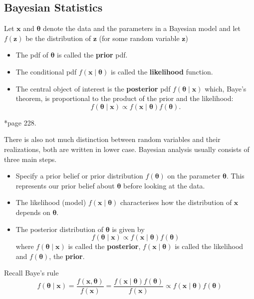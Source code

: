 \subsection*{Bayesian Statistics}

\begin{defe} \label{defe: prior_likeli_postr}
    Let $\bm{x}$ and $\bm{\theta}$ denote the data and the parameters in a Bayesian model and let $f(\bm{z})$ be the distribution of $\bm{z}$ (for some random variable $\bm{z}$)
    \begin{itemize}
        \item The pdf of $\bm{\theta}$ is called the {\bf prior} pdf.
        \item The conditional pdf $f(\bm{x} \mid \bm{\theta})$ is called the {\bf likelihood} function.
        \item The central object of interest is the {\bf posterior} pdf $f (\bm{\theta} \mid \bm{x})$ which, Baye's theorem, is proportional to the product of the prior and the likelihood:
              \[
                  f (\bm{\theta} \mid \bm{x}) \propto f(\bm{x} \mid \bm{\theta}) f(\bm{\theta}).
              \]
    \end{itemize}
    \cite{KroeseDirkP2013SMaC}*{page 228}.
\end{defe}

There is also not much distinction between random variables and their realizations, both are written in lower case. Bayesian analysis usually consists of three main steps.

\begin{itemize}
    \item Specify a prior belief or prior distribution $f(\bm{\theta})$ on the parameter $\bm{\theta}$. This represents our prior belief about $\bm{\theta}$ before looking at the data.
    \item The likelihood (model) $f (\bm{x} \mid \bm{\theta})$ characterises how the distribution of $\bm{x}$ depends on $\bm{\theta}$.
    \item The posterior distribution of $\bm{\theta}$ is given by
          \[
              f (\bm{\theta} \mid \bm{x}) \propto f(\bm{x} \mid \bm{\theta}) f(\bm{\theta})
          \]
          where $f (\bm{\theta} \mid \bm{x})$ is called the {\bf posterior}, $f(\bm{x} \mid \bm{\theta})$ is called the likelihood and $f(\bm{\theta})$, the {\bf prior}.
\end{itemize}

Recall Baye's rule
\[
    f (\bm{\theta} \mid \bm{x}) = \frac{f(\bm{x},\bm{\theta})}{f(\bm{x})} = \frac{f(\bm{x} \mid \bm{\theta}) f(\bm{\theta})}{f(\bm{x})} \propto f(\bm{x} \mid \bm{\theta}) f(\bm{\theta})
\]

